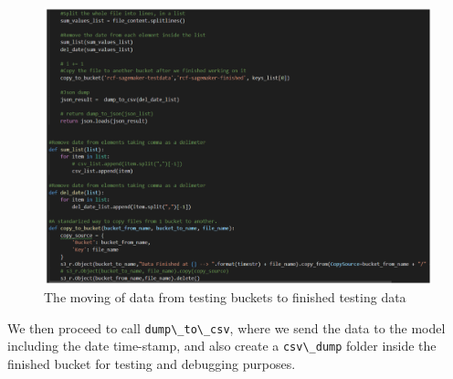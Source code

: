 \begin{figure}[h]
    \centering
    \includegraphics[width=1\textwidth]{images/rcf-data-movement.png}
    \caption{The moving of data from testing buckets to finished testing data}
    \label{fig:rcf_data_movement}
\end{figure}

We then proceed to call \verb|dump\_to\_csv|, where we send the data to the model including the date time-stamp, and also create a \verb|csv\_dump| folder inside the finished bucket for testing and debugging purposes.\\

